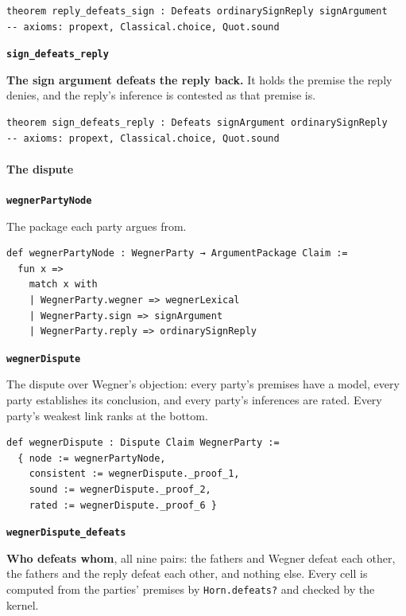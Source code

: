 \documentclass[11pt]{article}
\begin{document}
{\small\begin{verbatim}
theorem reply_defeats_sign : Defeats ordinarySignReply signArgument
-- axioms: propext, Classical.choice, Quot.sound
\end{verbatim}}
\par\medskip\noindent\textbf{\texttt{sign\_\allowbreak{}defeats\_\allowbreak{}reply}}\par\nobreak\noindent
\textbf{The sign argument defeats the reply back.} It holds the premise the reply denies, and the reply’s inference is contested as that premise is.

{\small\begin{verbatim}
theorem sign_defeats_reply : Defeats signArgument ordinarySignReply
-- axioms: propext, Classical.choice, Quot.sound
\end{verbatim}}
\paragraph*{The dispute}
\leavevmode\par\nobreak
\par\medskip\noindent\textbf{\texttt{wegner\allowbreak{}Party\allowbreak{}Node}}\par\nobreak\noindent
The package each party argues from.

{\small\begin{verbatim}
def wegnerPartyNode : WegnerParty → ArgumentPackage Claim :=
  fun x =>
    match x with
    | WegnerParty.wegner => wegnerLexical
    | WegnerParty.sign => signArgument
    | WegnerParty.reply => ordinarySignReply
\end{verbatim}}
\par\medskip\noindent\textbf{\texttt{wegner\allowbreak{}Dispute}}\par\nobreak\noindent
The dispute over Wegner’s objection: every party’s premises have a model, every party establishes its conclusion, and every party’s inferences are rated. Every party’s weakest link ranks at the bottom.

{\small\begin{verbatim}
def wegnerDispute : Dispute Claim WegnerParty :=
  { node := wegnerPartyNode,
    consistent := wegnerDispute._proof_1,
    sound := wegnerDispute._proof_2,
    rated := wegnerDispute._proof_6 }
\end{verbatim}}
\par\medskip\noindent\textbf{\texttt{wegner\allowbreak{}Dispute\_\allowbreak{}defeats}}\par\nobreak\noindent
\textbf{Who defeats whom}, all nine pairs: the fathers and Wegner defeat each other, the fathers and the reply defeat each other, and nothing else. Every cell is computed from the parties’ premises by \texttt{Horn.defeats?} and checked by the kernel.
\end{document}
